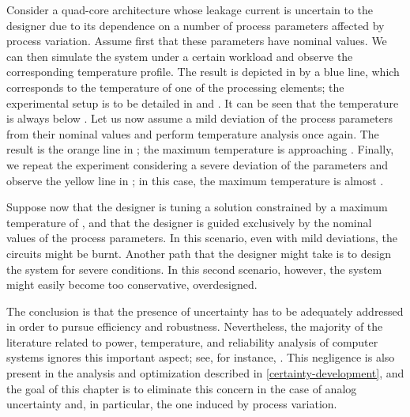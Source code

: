 Consider a quad-core architecture whose leakage current is uncertain to the
designer due to its dependence on a number of process parameters affected by
process variation. Assume first that these parameters have nominal values. We
can then simulate the system under a certain workload and observe the
corresponding temperature profile. The result is depicted in
 by a blue line, which corresponds to the temperature of one
of the processing elements; the experimental setup is to be detailed in
 and . It can be
seen that the temperature is always below . Let us now assume a mild
deviation of the process parameters from their nominal values and perform
temperature analysis once again. The result is the orange line in
; the maximum temperature is approaching .
Finally, we repeat the experiment considering a severe deviation of the
parameters and observe the yellow line in ; in this case,
the maximum temperature is almost .

Suppose now that the designer is tuning a solution constrained by a maximum
temperature of , and that the designer is guided exclusively by the
nominal values of the process parameters. In this scenario, even with mild
deviations, the circuits might be burnt. Another path that the designer might
take is to design the system for severe conditions. In this second scenario,
however, the system might easily become too conservative, overdesigned.

The conclusion is that the presence of uncertainty has to be adequately
addressed in order to pursue efficiency and robustness. Nevertheless, the
majority of the literature related to power, temperature, and reliability
analysis of computer systems ignores this important aspect; see, for instance,
\cite{rao2009, rai2011, thiele2011}. This negligence is also present in the
analysis and optimization described in \cref{certainty-development}, and the
goal of this chapter is to eliminate this concern in the case of analog
uncertainty and, in particular, the one induced by process variation.
